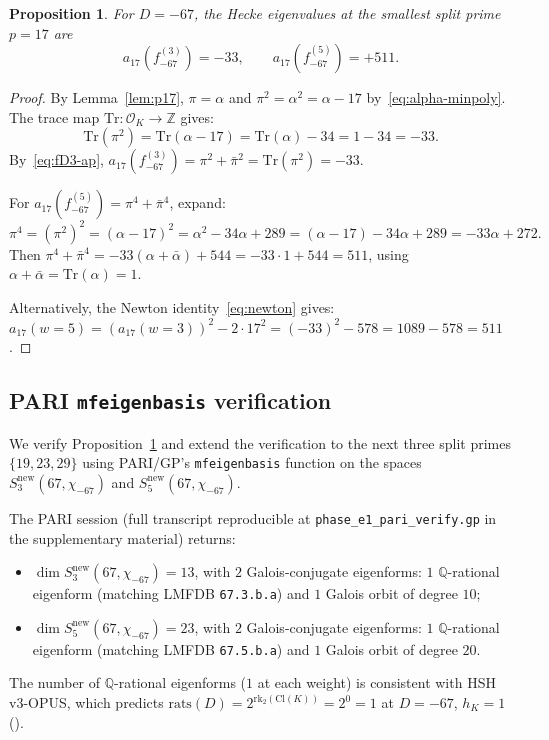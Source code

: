 \documentclass[11pt,a4paper]{amsart}
\providecommand{\OK}{\mathcal{O}_K}
\providecommand{\Z}{\mathbb{Z}}
\providecommand{\Q}{\mathbb{Q}}
\newtheorem{proposition}[theorem]{Proposition}
\theoremstyle{definition}
\begin{document}
\begin{proposition}\label{prop:a17}
For $D = -67$, the Hecke eigenvalues at the smallest split prime $p = 17$ are
\begin{equation}
a_{17}(f_{-67}^{(3)}) = -33, \qquad a_{17}(f_{-67}^{(5)}) = +511.
\end{equation}
\end{proposition}

\begin{proof}
By Lemma~\ref{lem:p17}, $\pi = \alpha$ and $\pi^{2} = \alpha^{2} = \alpha - 17$ by~\eqref{eq:alpha-minpoly}.
The trace map $\mathrm{Tr}: \OK \to \Z$ gives:
\[
\mathrm{Tr}(\pi^{2}) = \mathrm{Tr}(\alpha - 17) = \mathrm{Tr}(\alpha) - 34 = 1 - 34 = -33.
\]
By~\eqref{eq:fD3-ap}, $a_{17}(f_{-67}^{(3)}) = \pi^{2} + \bar\pi^{2} = \mathrm{Tr}(\pi^{2}) = -33$.

For $a_{17}(f_{-67}^{(5)}) = \pi^{4} + \bar\pi^{4}$, expand:
\[
\pi^{4} = (\pi^{2})^{2} = (\alpha - 17)^{2} = \alpha^{2} - 34\alpha + 289
       = (\alpha - 17) - 34\alpha + 289 = -33\alpha + 272.
\]
Then $\pi^{4} + \bar\pi^{4} = -33(\alpha + \bar\alpha) + 544 = -33 \cdot 1 + 544 = 511$,
using $\alpha + \bar\alpha = \mathrm{Tr}(\alpha) = 1$.

Alternatively, the Newton identity~\eqref{eq:newton} gives:
$a_{17}(w=5) = (a_{17}(w=3))^{2} - 2 \cdot 17^{2} = (-33)^{2} - 578 = 1089 - 578 = 511$.
\end{proof}

\subsection{PARI \texttt{mfeigenbasis} verification}\label{sec:PARI-verify}

We verify Proposition~\ref{prop:a17} and extend the verification to the next
three split primes $\{19, 23, 29\}$ using PARI/GP's \texttt{mfeigenbasis}
function on the spaces $S_{3}^{\mathrm{new}}(67, \chi_{-67})$ and
$S_{5}^{\mathrm{new}}(67, \chi_{-67})$.

The PARI session (full transcript reproducible at
\texttt{phase\_e1\_pari\_verify.gp} in the supplementary material) returns:
\begin{itemize}\setlength\itemsep{2pt}
\item $\dim S_{3}^{\mathrm{new}}(67, \chi_{-67}) = 13$, with $2$ Galois-conjugate
      eigenforms: $1$ $\Q$-rational eigenform (matching LMFDB \texttt{67.3.b.a})
      and $1$ Galois orbit of degree $10$;
\item $\dim S_{5}^{\mathrm{new}}(67, \chi_{-67}) = 23$, with $2$ Galois-conjugate
      eigenforms: $1$ $\Q$-rational eigenform (matching LMFDB \texttt{67.5.b.a})
      and $1$ Galois orbit of degree $20$.
\end{itemize}
The number of $\Q$-rational eigenforms ($1$ at each weight) is consistent with
HSH v3-OPUS, which predicts $\mathrm{rats}(D) = 2^{\mathrm{rk}_{2}(\mathrm{Cl}(K))} = 2^{0} = 1$
at $D = -67$, $h_{K} = 1$ (\cite{HSHv3OPUS}).
\end{document}
